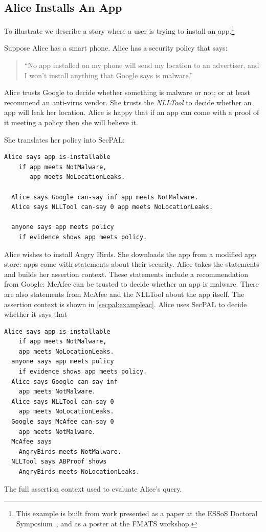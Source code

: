 \documentclass[a4paper,sfsidenotes]{%
  scrartcl%
}
\begin{document}
\subsection{Alice Installs An App}

To illustrate we describe a story
where a user is trying to install an app.\footnote{This example is
built from work presented as a paper at the ESSoS Doctoral
Symposium~\cite{Hallett:2014un}, and as a poster at the FMATS workshop.}

Suppose Alice has a smart phone.  Alice has a security policy that says:
\begin{quote}
    ``No app installed on my phone will send my location to an advertiser, and I
      won't install anything that Google says is malware.''
\end{quote}
Alice trusts Google to decide whether something is malware or not; or at least
recommend an anti-virus vendor. She trusts the \emph{NLLTool} to decide whether
an app will leak her location.  Alice is happy that if an app can come with a
proof of it meeting a policy then she will believe it.

She translates her policy into SecPAL:

\begin{lstlisting}[language=SecPAL]
  Alice says app is-installable 
    if app meets NotMalware, 
       app meets NoLocationLeaks.

  Alice says Google can-say inf app meets NotMalware.
  Alice says NLLTool can-say 0 app meets NoLocationLeaks.

  anyone says app meets policy
    if evidence shows app meets policy.
\end{lstlisting}

Alice wishes to install Angry Birds. She downloads the app from a
modified app store: apps come with statements about their security.  Alice
takes the statements  and builds her assertion context.  These
statements include a recommendation from Google: McAfee can be trusted to
decide whether an app is malware. There are also statements from McAfee
and the NLLTool about the app itself. The assertion context is shown in
\autoref{secpal:exampleac}.
Alice uses SecPAL to decide whether it says
that 

\begin{marginfigure}
\begin{lstlisting}[language=SecPAL]
  Alice says app is-installable 
    if app meets NotMalware, 
    app meets NoLocationLeaks.
  anyone says app meets policy 
    if evidence shows app meets policy.
  Alice says Google can-say inf 
    app meets NotMalware.
  Alice says NLLTool can-say 0 
    app meets NoLocationLeaks.
  Google says McAfee can-say 0 
    app meets NotMalware.
  McAfee says 
    AngryBirds meets NotMalware.
  NLLTool says ABProof shows 
    AngryBirds meets NoLocationLeaks.
\end{lstlisting}
\caption{The full assertion context used to evaluate Alice's query.}\label{secpal:exampleac}
\end{marginfigure}
\end{document}
